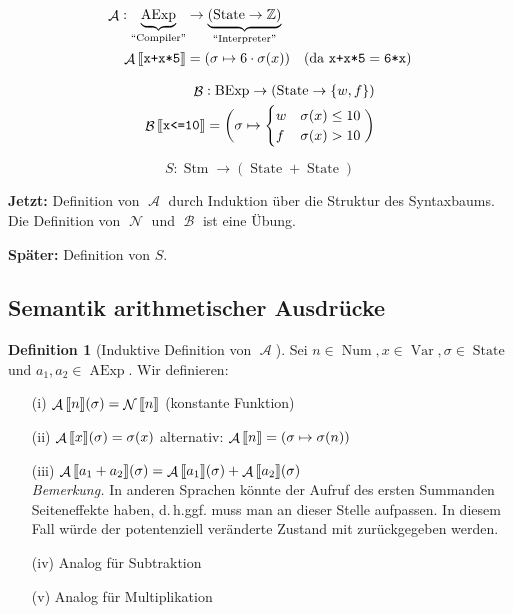 \documentclass[a4paper,12pt]{article}
\theoremstyle{definition}
\newtheorem{definition}{Definition}[section]
\theoremstyle{plain}
\theoremstyle{remark}
\newcommand{\lsem}{\mathrm{[}\kern-.14em\mathrm{[}}
\newcommand{\rsem}{\mathrm{]}\kern-.14em\mathrm{]}}
\renewcommand{\dh}{d.\,h.\;}
\DeclareMathOperator{\AExp}{AExp}
\DeclareMathOperator{\BExp}{BExp}
\DeclareMathOperator{\Stm}{Stm}
\DeclareMathOperator{\Num}{Num}
\DeclareMathOperator{\Var}{Var}
\DeclareMathOperator{\State}{State}
\DeclareMathOperator{\A}{\mathcal{A}}
\DeclareMathOperator{\B}{\mathcal{B}}
\DeclareMathOperator{\N}{\mathcal{N}}
\begin{document}
\begin{align*}
    \A: \underbrace{\AExp}_{\text{``Compiler''}} & \to \underbrace{(\State \to \mathbb{Z})}_{\text{``Interpreter''}} \\
    \A\lsem\texttt{x+x*5}\rsem & = (\sigma \mapsto 6 \cdot \sigma(x)) \quad (\text{da }\texttt{x+x*5} = \texttt{6*x})
\end{align*}

\begin{align*}
    \B : \BExp \to (\State \to \{ w, f \}) \\
    \B\lsem\texttt{x<=10}\rsem = \bigg( \sigma \mapsto \begin{cases}
        w & \sigma(x) \leq 10 \\
        f & \sigma(x) > 10
    \end{cases} \bigg)
\end{align*}

$$S: \Stm \to (\State + \State)$$

\textbf{Jetzt:} Definition von $\A$ durch Induktion über die Struktur des Syntaxbaums. Die Definition von $\N$ und $\B$ ist eine Übung.

\textbf{Später:} Definition von $S$.


\subsection{Semantik arithmetischer Ausdrücke}

\begin{definition}[Induktive Definition von $\A$] \label{def:Asem}
    Sei $n \in \Num, x \in \Var, \sigma \in \State$ und $a_1, a_2 \in \AExp$. Wir definieren:
    \begin{enumerate}
        \item[(i)] $\A\lsem n \rsem(\sigma) = \N\lsem n \rsem$ \quad\quad (konstante Funktion)
        \item[(ii)] $\A\lsem x \rsem(\sigma) = \sigma(x)$ \quad\quad\quad alternativ: $\A\lsem n \rsem = (\sigma \mapsto \sigma(n))$
        \item[(iii)] $\A\lsem a_1 + a_2 \rsem(\sigma) = \A\lsem a_1 \rsem(\sigma) + \A\lsem a_2 \rsem(\sigma)$ \\[4pt]
        \emph{Bemerkung.} In anderen Sprachen könnte der Aufruf des ersten Summanden Seiteneffekte haben, \dh ggf. muss man an dieser Stelle aufpassen. In diesem Fall würde der potentenziell veränderte Zustand mit zurückgegeben werden.
        \item[(iv)] Analog für Subtraktion
        \item[(v)] Analog für Multiplikation
    \end{enumerate}
\end{definition}
\end{document}
